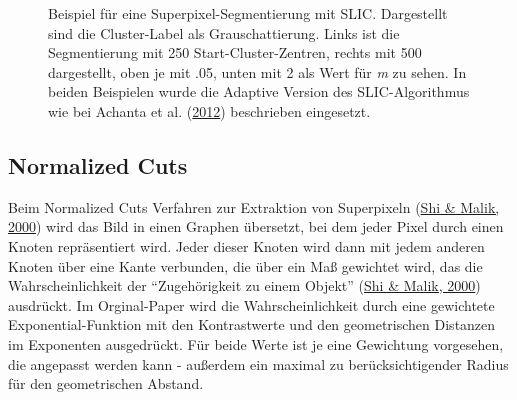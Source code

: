 \documentclass[
  12pt,
]{book}
\begin{document}
\begin{figure}
{}

\caption[Beispiel für eine Superpixel-Segmentierung mit SLIC.]{Beispiel für eine Superpixel-Segmentierung mit SLIC. Dargestellt sind die Cluster-Label als Grauschattierung. Links ist die Segmentierung mit 250 Start-Cluster-Zentren, rechts mit 500 dargestellt, oben je mit .05, unten mit 2 als Wert für \emph{m} zu sehen. In beiden Beispielen wurde die Adaptive Version des SLIC-Algorithmus wie bei Achanta et al. (\protect\hyperlink{ref-achantaSLICSuperpixelsCompared2012}{2012}) beschrieben eingesetzt.}\label{fig:slicExample}
\end{figure}

\hypertarget{normalized-cuts}{%
\subsection{Normalized Cuts}\label{normalized-cuts}}

Beim Normalized Cuts Verfahren zur Extraktion von Superpixeln (\protect\hyperlink{ref-shiNormalizedCutsImage2000}{Shi \& Malik, 2000}) wird das Bild in einen Graphen übersetzt, bei dem jeder Pixel durch einen Knoten repräsentiert wird. Jeder dieser Knoten wird dann mit jedem anderen Knoten über eine Kante verbunden, die über ein Maß gewichtet wird, das die Wahrscheinlichkeit der ``Zugehörigkeit zu einem Objekt'' (\protect\hyperlink{ref-shiNormalizedCutsImage2000}{Shi \& Malik, 2000}) ausdrückt.
Im Orginal-Paper wird die Wahrscheinlichkeit durch eine gewichtete Exponential-Funktion mit den Kontrastwerte und den geometrischen Distanzen im Exponenten ausgedrückt. Für beide Werte ist je eine Gewichtung vorgesehen, die angepasst werden kann - außerdem ein maximal zu berücksichtigender Radius für den geometrischen Abstand.
\end{document}
